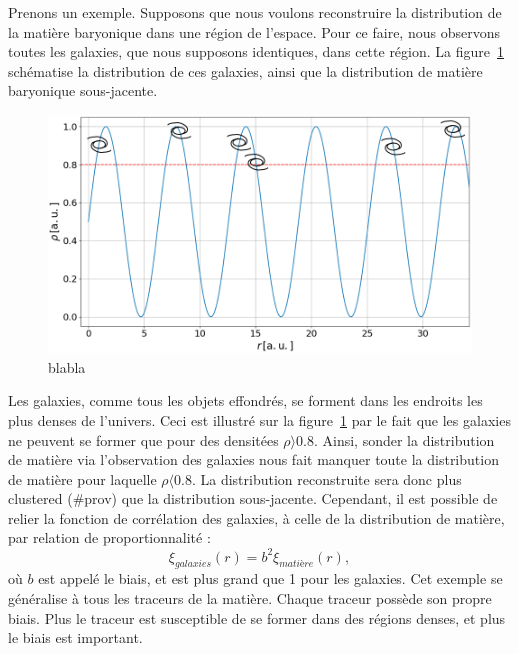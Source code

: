 \documentclass[11pt, twoside, a4paper, openright]{report}
\begin{document}
Prenons un exemple. Supposons que nous voulons reconstruire la distribution de la matière baryonique dans une région de l'espace. Pour ce faire, nous observons toutes les galaxies, que nous supposons identiques, dans cette région. La figure~\ref{fig:schema_biais} schématise la distribution de ces galaxies, ainsi que la distribution de matière baryonique sous-jacente.
\begin{figure}
  \centering
  \includegraphics[scale=0.4]{schema_biais}
  \caption{blabla}
  \label{fig:schema_biais}
\end{figure}
Les galaxies, comme tous les objets effondrés, se forment dans les endroits les plus denses de l'univers. Ceci est illustré sur la figure~\ref{fig:schema_biais} par le fait que les galaxies ne peuvent se former que pour des densitées $\rho \rangle 0.8$. Ainsi, sonder la distribution de matière via l'observation des galaxies nous fait manquer toute la distribution de matière pour laquelle $\rho \langle 0.8$. La distribution reconstruite sera donc plus clustered (\#prov) que la distribution sous-jacente. Cependant, il est possible de relier la fonction de corrélation des galaxies, à celle de la distribution de matière, par relation de proportionnalité :
\begin{equation}
  \label{eq:biais1}
  \xi_{galaxies}(r) = b^2 \xi_{matière}(r) ,
\end{equation}
où $b$ est appelé le biais, et est plus grand que 1 pour les galaxies. Cet exemple se généralise à tous les traceurs de la matière. Chaque traceur possède son propre biais. Plus le traceur est susceptible de se former dans des régions denses, et plus le biais est important.
\end{document}
